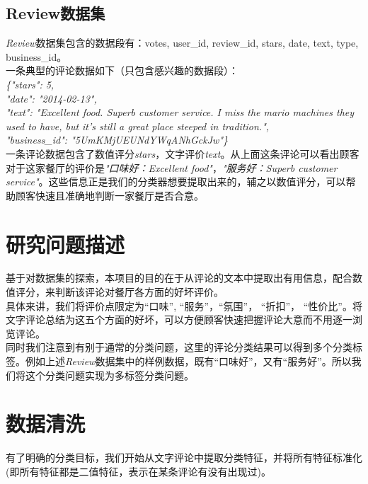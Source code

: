 \documentclass[a4paper, twocolumn]{article}
\begin{document}
\begin{CJK}{UTF8}{gbsn}
	\subsection{Review数据集}
	\textit{Review}数据集包含的数据段有：votes, user\_id, review\_id, stars, date, text, type, business\_id。\\
	一条典型的评论数据如下（只包含感兴趣的数据段）：\\ 
	\textit{\{"stars": 5, \\
		"date": "2014-02-13", \\
		"text": "Excellent food. Superb customer service. I miss the mario machines they used to have, but it's still a great place steeped in tradition.", \\
		"business\_id": "5UmKMjUEUNdYWqANhGckJw"\}} \\
	一条评论数据包含了数值评分\textit{stars}，文字评价\textit{text}。从上面这条评论可以看出顾客对于这家餐厅的评价是\textit{"口味好：Excellent food"}，\textit{"服务好：Superb customer service"}。这些信息正是我们的分类器想要提取出来的，辅之以数值评分，可以帮助顾客快速且准确地判断一家餐厅是否合意。
	
	\section{研究问题描述}
	基于对数据集的探索，本项目的目的在于从评论的文本中提取出有用信息，配合数值评分，来判断该评论对餐厅各方面的好坏评价。\\
	具体来讲，我们将评价点限定为“口味”, “服务”，“氛围”， “折扣”， “性价比”。将文字评论总结为这五个方面的好坏，可以方便顾客快速把握评论大意而不用逐一浏览评论。\\
	同时我们注意到有别于通常的分类问题，这里的评论分类结果可以得到多个分类标签。例如上述\textit{Review}数据集中的样例数据，既有“口味好”，又有“服务好”。所以我们将这个分类问题实现为多标签分类问题。
	
	\section{数据清洗}
	有了明确的分类目标，我们开始从文字评论中提取分类特征，并将所有特征标准化(即所有特征都是二值特征，表示在某条评论有没有出现过)。

\end{CJK}
\end{document}
